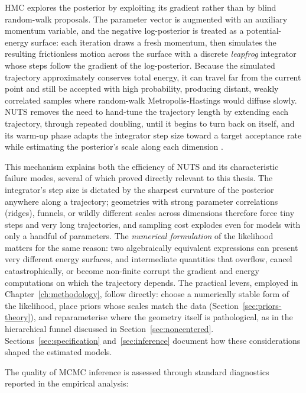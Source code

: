 \documentclass[12pt, a4paper, oneside]{report}
\begin{document}
HMC explores the posterior by exploiting its gradient rather than by blind random-walk proposals. The parameter vector is augmented with an auxiliary momentum variable, and the negative log-posterior is treated as a potential-energy surface: each iteration draws a fresh momentum, then simulates the resulting frictionless motion across the surface with a discrete \emph{leapfrog} integrator whose steps follow the gradient of the log-posterior. Because the simulated trajectory approximately conserves total energy, it can travel far from the current point and still be accepted with high probability, producing distant, weakly correlated samples where random-walk Metropolis-Hastings would diffuse slowly. NUTS removes the need to hand-tune the trajectory length by extending each trajectory, through repeated doubling, until it begins to turn back on itself, and its warm-up phase adapts the integrator step size toward a target acceptance rate while estimating the posterior's scale along each dimension \parencite{hoffman2014}.

This mechanism explains both the efficiency of NUTS and its characteristic failure modes, several of which proved directly relevant to this thesis. The integrator's step size is dictated by the sharpest curvature of the posterior anywhere along a trajectory; geometries with strong parameter correlations (ridges), funnels, or wildly different scales across dimensions therefore force tiny steps and very long trajectories, and sampling cost explodes even for models with only a handful of parameters. The \emph{numerical formulation} of the likelihood matters for the same reason: two algebraically equivalent expressions can present very different energy surfaces, and intermediate quantities that overflow, cancel catastrophically, or become non-finite corrupt the gradient and energy computations on which the trajectory depends. The practical levers, employed in Chapter~\ref{ch:methodology}, follow directly: choose a numerically stable form of the likelihood, place priors whose scales match the data (Section~\ref{sec:priors-theory}), and reparameterise where the geometry itself is pathological, as in the hierarchical funnel discussed in Section~\ref{sec:noncentered}. Sections~\ref{sec:specification} and~\ref{sec:inference} document how these considerations shaped the estimated models.

The quality of MCMC inference is assessed through standard diagnostics reported in the empirical analysis:
\end{document}

